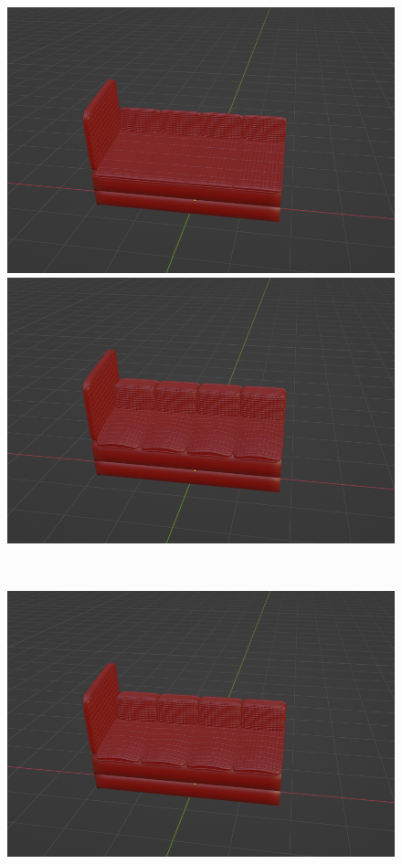 \begin{figure}[h]
\begin{minipage}[b]{0.48\linewidth}
  \includegraphics[scale=0.17]{./imgs/sofaParamMean/backCushionTickMin.png}
 \end{minipage}
 \begin{minipage}[b]{0.48\linewidth}
  \centering
  \includegraphics[scale=0.17]{./imgs/sofaParamMean/backCushionTickMax.png}
 \end{minipage}\\
  \begin{minipage}[b]{0.48\linewidth}
  \centering
  \includegraphics[scale=0.17]{./imgs/sofaParamMean/sideNumMin.png}

\end{minipage}
\end{figure}
